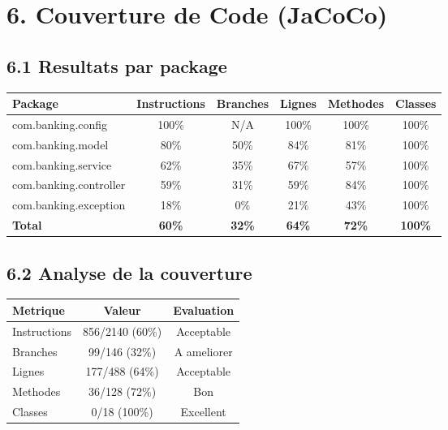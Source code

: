 \documentclass[12pt,a4paper]{article}
\begin{document}
\newpage

\section*{6. Couverture de Code (JaCoCo)}

\subsection*{6.1 Resultats par package}

\begin{table}[h]
\centering
\begin{tabular}{|l|c|c|c|c|c|}
\hline
\rowcolor[gray]{0.9}
\textbf{Package} & \textbf{Instructions} & \textbf{Branches} & \textbf{Lignes} & \textbf{Methodes} & \textbf{Classes} \\
\hline
com.banking.config & 100\% & N/A & 100\% & 100\% & 100\% \\
\hline
com.banking.model & 80\% & 50\% & 84\% & 81\% & 100\% \\
\hline
com.banking.service & 62\% & 35\% & 67\% & 57\% & 100\% \\
\hline
com.banking.controller & 59\% & 31\% & 59\% & 84\% & 100\% \\
\hline
com.banking.exception & 18\% & 0\% & 21\% & 43\% & 100\% \\
\hline
\textbf{Total} & \textbf{60\%} & \textbf{32\%} & \textbf{64\%} & \textbf{72\%} & \textbf{100\%} \\
\hline
\end{tabular}
\end{table}

\subsection*{6.2 Analyse de la couverture}

\begin{table}[h]
\centering
\begin{tabular}{|l|c|c|}
\hline
\rowcolor[gray]{0.9}
\textbf{Metrique} & \textbf{Valeur} & \textbf{Evaluation} \\
\hline
Instructions & 856/2140 (60\%) & Acceptable \\
\hline
Branches & 99/146 (32\%) & A ameliorer \\
\hline
Lignes & 177/488 (64\%) & Acceptable \\
\hline
Methodes & 36/128 (72\%) & Bon \\
\hline
Classes & 0/18 (100\%) & Excellent \\
\hline
\end{tabular}
\end{table}
\end{document}
